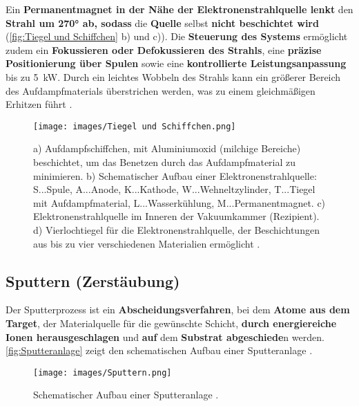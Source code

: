 \documentclass{article} %
\begin{document}
Ein \textbf{Permanentmagnet in der Nähe der Elektronenstrahlquelle lenkt} den \textbf{Strahl um 270° ab, sodass} die \textbf{Quelle} selbst 
\textbf{nicht beschichtet wird} (\autoref{fig:Tiegel und Schiffchen} b) und c)). Die \textbf{Steuerung des Systems} ermöglicht zudem ein 
\textbf{Fokussieren oder Defokussieren des Strahls}, eine \textbf{präzise Positionierung über Spulen} sowie eine \textbf{kontrollierte 
Leistungsanpassung} bis zu 5~kW. Durch ein leichtes Wobbeln des Strahls kann ein größerer Bereich des Aufdampfmaterials überstrichen werden, was
 zu einem gleichmäßigen Erhitzen führt \cite{keplinger2024}.

\begin{figure}[htb!]
    \centering
    \texttt{[image: images/Tiegel und Schiffchen.png]} %
    \captionsetup{labelfont=bf} %
    \caption{%
    a) Aufdampfschiffchen, mit Aluminiumoxid (milchige Bereiche) beschichtet, um das Benetzen durch das Aufdampfmaterial zu minimieren. 
    b) Schematischer Aufbau einer Elektronenstrahlquelle: S...Spule, A...Anode, K...Kathode, W...Wehneltzylinder, T...Tiegel mit 
    Aufdampfmaterial, L...Wasserkühlung, M...Permanentmagnet.  
    c) Elektronenstrahlquelle im Inneren der Vakuumkammer (Rezipient). 
    d) Vierlochtiegel für die Elektronenstrahlquelle, der Beschichtungen aus bis zu vier verschiedenen Materialien ermöglicht 
    \cite{keplinger2024}.
    }
    \label{fig:Tiegel und Schiffchen}
\end{figure}

\vspace{1em}
\subsection{Sputtern (Zerstäubung)} %

Der Sputterprozess ist ein \textbf{Abscheidungsverfahren}, bei dem \textbf{Atome aus dem Target}, der Materialquelle für die gewünschte Schicht, 
\textbf{durch energiereiche Ionen herausgeschlagen} und \textbf{auf} dem \textbf{Substrat abgeschiede}n werden. \autoref{fig:Sputteranlage}
zeigt den schematischen Aufbau einer Sputteranlage \cite{keplinger2024}.

\begin{figure}[htb!]
    \centering
    \texttt{[image: images/Sputtern.png]} %
    \captionsetup{labelfont=bf} %
    \caption{Schematischer Aufbau einer Sputteranlage \cite{keplinger2024}.}
    \label{fig:Sputteranlage}
\end{figure}
\end{document}
